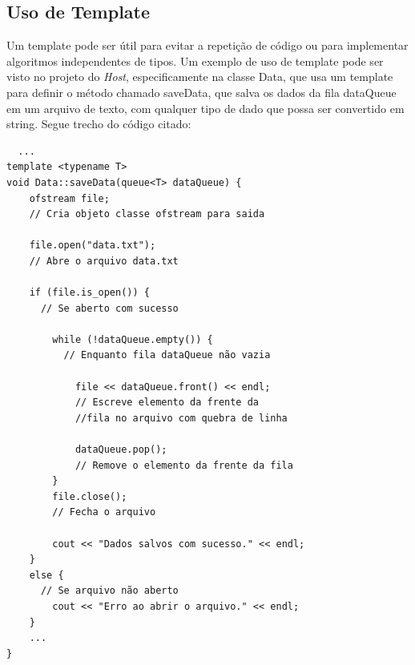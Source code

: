 \documentclass[10pt,twocolumn,letterpaper]{article}
\begin{document}
\subsection{Uso de Template}
Um template pode ser útil para evitar a repetição de código ou para implementar algoritmos independentes de tipos. 
Um exemplo de uso de template pode ser visto no projeto do \emph{Host}, especificamente na classe Data, que usa um template para definir o método chamado saveData, que salva os dados da fila dataQueue em um arquivo de texto, com qualquer tipo de dado que possa ser convertido em string.
Segue trecho do código citado: 
{\scriptsize
\begin{verbatim}
  ...
template <typename T>
void Data::saveData(queue<T> dataQueue) {
    ofstream file; 
    // Cria objeto classe ofstream para saida
    
    file.open("data.txt"); 
    // Abre o arquivo data.txt
    
    if (file.is_open()) { 
      // Se aberto com sucesso

        while (!dataQueue.empty()) { 
          // Enquanto fila dataQueue não vazia

            file << dataQueue.front() << endl; 
            // Escreve elemento da frente da 
            //fila no arquivo com quebra de linha

            dataQueue.pop(); 
            // Remove o elemento da frente da fila
        }
        file.close(); 
        // Fecha o arquivo

        cout << "Dados salvos com sucesso." << endl;
    }
    else { 
      // Se arquivo não aberto
        cout << "Erro ao abrir o arquivo." << endl;
    }
    ...
}

\end{verbatim}
}
\end{document}
